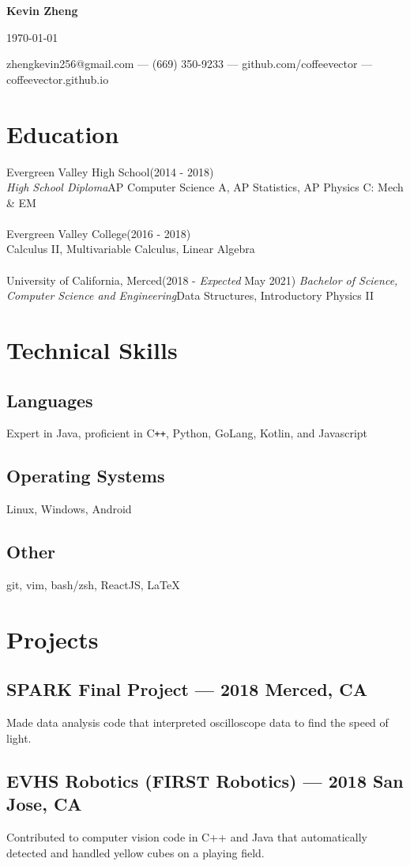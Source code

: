 \documentclass[letterpaper,12pt]{article}
\makeatletter
\newcommand\textbox[1]{%
	\parbox{.333\textwidth}{#1}%
}
\renewcommand{\maketitle}{
	\begin{center}
		\noindent\textbox{\hfill}\textbox{\hfil\bfseries\huge Kevin Zheng\hfil}\textbox{\hfill \today}
		{zhengkevin256@gmail.com --- (669) 350-9233 --- github.com/coffeevector --- coffeevector.github.io}
	\end{center} }
\makeatother
\begin{document}
\maketitle
\section{Education}
Evergreen Valley High School\null\hfill (2014 - 2018)\\
\emph{High School Diploma}\null\hfill AP Computer Science A, AP Statistics, AP Physics C: Mech \& EM\\~\\
Evergreen Valley College\null\hfill (2016 - 2018)\\
\null\hfill Calculus II, Multivariable Calculus, Linear Algebra\\~\\
University of California, Merced\null\hfill(2018 - \emph{Expected} May 2021)\newline
\emph{Bachelor of Science, Computer Science and Engineering}\null\hfill Data Structures, Introductory Physics II
\section{Technical Skills}
\subsection{Languages}
Expert in Java, proficient in C\verb!++!, Python, GoLang, Kotlin, and Javascript
\subsection{Operating Systems}
Linux, Windows, Android
\vspace*{-2mm}
\subsection{Other}
git, vim, bash/zsh, ReactJS, {\LaTeX}
\section{Projects}
	\subsection{SPARK Final Project --- 2018 \null\hfill Merced, CA}
	\par Made data analysis code that interpreted oscilloscope data to find the speed of light.
	\subsection{EVHS Robotics (FIRST Robotics) --- 2018 \null\hfill San Jose, CA}
	\par Contributed to computer vision code in C++ and Java that automatically detected and handled yellow cubes on a playing field.
\end{document}
